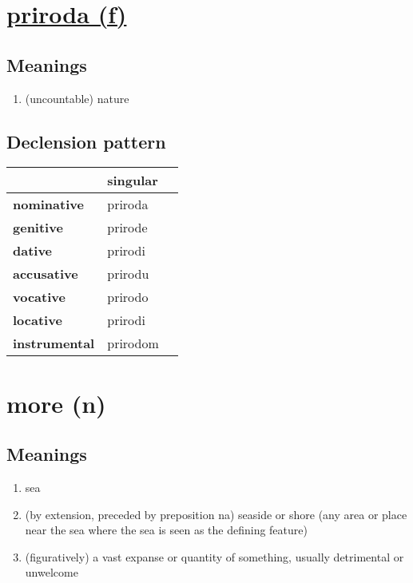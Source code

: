 \filbreak
\section{\underline{priroda (f)}}
\subsection*{Meanings}
\begin{enumerate}
\item (uncountable) nature
\end{enumerate}
\subsection*{Declension pattern}
\begin{tabularx}{\linewidth}{Xll}
\toprule
{} &  singular \\
\midrule
\textbf{nominative  } &   priroda \\
\textbf{genitive    } &   prirode \\
\textbf{dative      } &   prirodi \\
\textbf{accusative  } &   prirodu \\
\textbf{vocative    } &   prirodo \\
\textbf{locative    } &   prirodi \\
\textbf{instrumental} &  prirodom \\
\bottomrule
\end{tabularx}

\filbreak
\section{more (n)}
\subsection*{Meanings}
\begin{enumerate}
\item sea
\item (by extension, preceded by preposition na) seaside or shore (any area or place near the sea where the sea is seen as the defining feature)
\item (figuratively) a vast expanse or quantity of something, usually detrimental or unwelcome
\end{enumerate}
